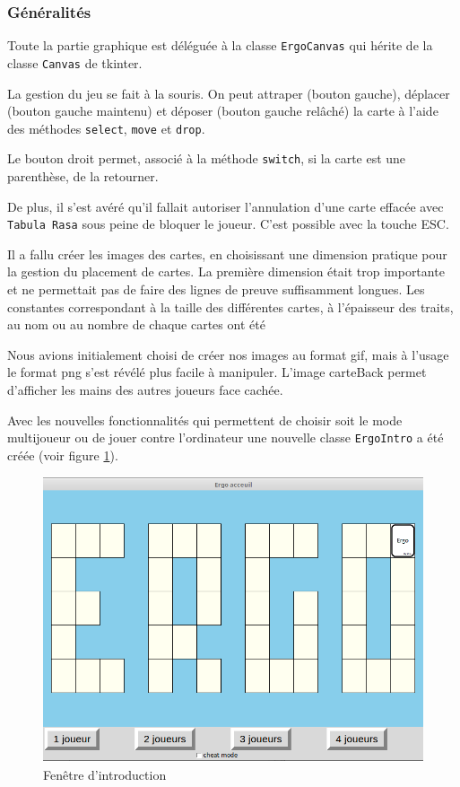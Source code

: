 \documentclass[12pt, a4paper]{article}
\begin{document}
\subsubsection{Généralités}

Toute la partie graphique est déléguée à la classe \texttt{ErgoCanvas} qui hérite de la classe \texttt{Canvas} de tkinter. 

La gestion du jeu se fait à la souris. On peut attraper (bouton gauche), déplacer (bouton gauche maintenu) et déposer (bouton gauche relâché) la carte à l'aide des méthodes \texttt{select}, \texttt{move} et \texttt{drop}.

Le bouton droit permet, associé à la méthode \texttt{switch}, si la carte est une parenthèse, de la retourner.

De plus, il s'est avéré qu'il fallait autoriser l'annulation d'une carte effacée avec \texttt{Tabula Rasa} sous peine de bloquer le joueur. C'est possible avec la touche ESC.

Il a fallu créer les images des cartes, en choisissant une dimension pratique pour la gestion du placement de cartes. La première dimension était trop importante et ne permettait pas de faire des lignes de preuve suffisamment longues. Les constantes correspondant à la taille des différentes cartes, à l'épaisseur des traits, au nom ou au nombre de chaque cartes ont été 

Nous avions initialement choisi de créer nos images au format gif, mais à l'usage le format png s'est révélé plus facile à manipuler. L'image carteBack permet d'afficher les mains des autres joueurs face cachée.

Avec les nouvelles fonctionnalités qui permettent de choisir soit le mode multijoueur ou de jouer contre l'ordinateur une nouvelle classe \texttt{ErgoIntro} a été créée (voir figure \ref{ergoIntro}).

\begin{figure}
\begin{center}
\includegraphics[scale=0.35]{../images/ima1.png}
\end{center}
\caption{Fenêtre d'introduction}
\label{ergoIntro}
\end{figure} 
\end{document}
